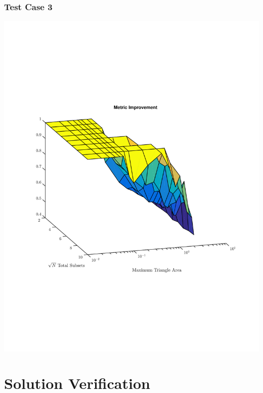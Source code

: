 \documentclass[]{beamer}
\begin{document}
\begin{frame}[t]\frametitle{Test Case 3}
\includegraphics[scale=0.47, trim = 0cm 8cm 0cm 7cm]{figures/lattice_diff.pdf}
\end{frame}

\section{Solution Verification}
\end{document}

